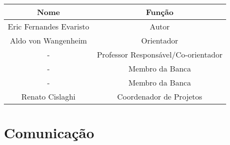 \begin{tabular}{|c|c|}
	\arrayrulecolor{white}
	\hline
	\arrayrulecolor{black}
	\hline
	\rowcolor{shadecolor}
	\textbf{Nome}           & \textbf{Função}                     \\ \hline
	Eric Fernandes Evaristo & Autor                               \\ \hline
	Aldo von Wangenheim     & Orientador                          \\ \hline
	-                       & Professor Responsável/Co-orientador \\ \hline
	-                       & Membro da Banca                     \\ \hline
	-                       & Membro da Banca                     \\ \hline
	Renato Cislaghi         & Coordenador de Projetos             \\ \hline
\end{tabular}

\section{Comunicação}

